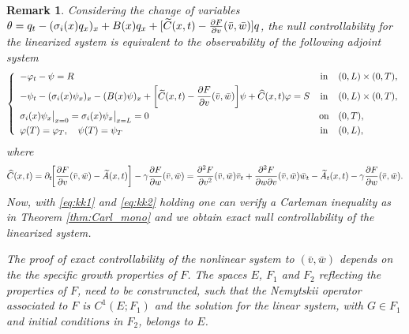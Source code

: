 \documentclass[10pt]{article}
\newtheorem{rmq}{Remark}
\def\dis{\displaystyle}
\def\\Phivec{\mathbf{\Phi}}
\begin{document}
\begin{rmq}
{	Considering the change of variables $\theta =q_t-(\sigma_i(x)q_x)_x+{ B(x)q_x+[\widetilde C(x,t)-{\partial F\over \partial v}(\bar v,\bar w)]q}$,  the null controllability for the linearized system is equivalent to the observability
	of the following adjoint system
\[
	\left\{
		\begin{array}{lcl}
			- \varphi_t  -\psi=R 					&\mbox{in}&	 (0,L) \times (0,T), 		\\
			\noalign{\smallskip}\dis
			-\psi_t-(\sigma_i(x)\psi_x)_x-({ B(x)\psi})_x+{\left[\widetilde C(x,t)-{\partial F\over \partial v}(\bar v,\bar w)\right]}\psi +{\widehat C(x,t)}\varphi=S 	&\mbox{in}&	 (0,L) \times (0,T),  		\\
			\noalign{\smallskip}\dis
			\sigma_i(x)\psi_{x}\big|_{x=0}=\sigma_i(x)\psi_{x}\big|_{x=L} = 0     				&\mbox{on}&	(0,T), 	\\
			\noalign{\smallskip}\dis
			\varphi(T) = \varphi_T,\quad\psi(T) = \psi_T 		&\mbox{in}&	(0,L),
		\end{array}
	\right.
\]
	where
	$$
	\widehat C(x,t)=\partial_t\!\!\left[{\partial F\over \partial v}(\bar v,\bar w)-\widetilde A(x,t)\right]-\gamma{\partial F\over \partial w}(\bar v,\bar w)={\partial^2 F\over \partial v^2}(\bar v,\bar w)\bar v_t+
	{\partial^2 F\over \partial w \partial v}(\bar v,\bar w)\bar w_t-\widetilde A_t(x,t)-\gamma{\partial F\over \partial w}(\bar v,\bar w).$$
	 Now, with \eqref{eq:kk1} and \eqref{eq:kk2} holding one can verify  a Carleman inequality as in Theorem \ref{thm:Carl_mono} and we obtain exact null controllability of the linearized system.
	
	The proof of exact controllability of the nonlinear system to $(\bar v, \bar w)$  depends on the
the specific growth properties of $F$.  
The spaces  $E$, $F_1$ and $F_2$ reflecting the properties of $F$,  need to be construncted,  such that the Nemytskii operator associated to $F$ is
	$C^1(E;F_1)$ and the solution for the linear system, with $G\in F_1$ and initial conditions in $F_2$, belongs to $E$.}
\end{rmq}	

%
%


\end{document}
